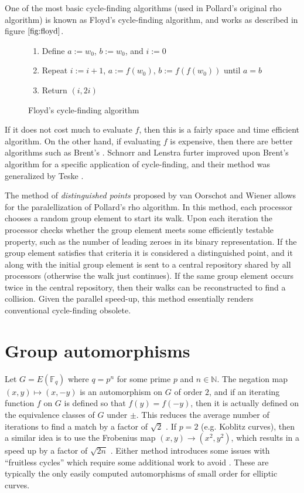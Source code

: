 \documentclass{article}
\newcommand{\NN}{\mathbb{N}}
\newcommand{\FF}{\mathbb{F}}
\begin{document}
One of the most basic cycle-finding algorithms (used in Pollard's original rho algorithm) is known as Floyd's cycle-finding algorithm, and works as described in figure $\ref{fig:floyd}$.
\begin{figure}[H]

	\begin{enumerate}
		\item Define $a := w_0$, $b := w_0$, and $i := 0$
		\item Repeat $i := i+1$, $a := f(w_0)$, $b := f(f(w_0))$ until $a=b$
		\item Return $(i,2i)$
	\end{enumerate}
	\caption{Floyd's cycle-finding algorithm \cite{Brent80}}
	\label{fig:floyd}
\end{figure}
If it does not cost much to evaluate $f$, then this is a fairly space and time efficient algorithm. On the other hand, if evaluating $f$ is expensive, then there are better algorithms such as Brent's \cite{Brent80}. Schnorr and Lenstra furter improved upon Brent's algorithm for a specific application of cycle-finding, and their method was generalized by Teske \cite{Teske98}.

The method of \textit{distinguished points} proposed by van Oorschot and Wiener \cite{vOW99} allows for the paralellization of Pollard's rho algorithm. In this method, each processor chooses a random group element to start its walk. Upon each iteration the processor checks whether the group element meets some efficiently testable property, such as the number of leading zeroes in its binary representation. If the group element satisfies that criteria it is considered a distinguished point, and it along with the initial group element is sent to a central repository shared by all processors (otherwise the walk just continues). If the same group element occurs twice in the central repository, then their walks can be reconstructed to find a collision. Given the parallel speed-up, this method essentially renders conventional cycle-finding obsolete.

\section{Group automorphisms}

Let $G=E(\FF_q)$ where $q=p^n$ for some prime $p$ and $n \in \NN$. The negation map $(x,y) \mapsto (x,-y)$ is an automorphism on $G$ of order $2$, and if an iterating function $f$ on $G$ is defined so that $f(y)=f(-y)$, then it is actually defined on the equivalence classes of $G$ under $\pm$. This reduces the average number of iterations to find a match by a factor of $\sqrt{2}$ \cite{DJB11}. If $p=2$ (e.g. Koblitz curves), then a similar idea is to use the Frobenius map $(x,y) \to (x^2,y^2)$, which results in a speed up by a factor of $\sqrt{2n}$ \cite{Gallant2000}. Either method introduces some issues with ``fruitless cycles'' which require some additional work to avoid \cite{Joppe2010}. These are typically the only easily computed automorphisms of small order for elliptic curves.
\end{document}

